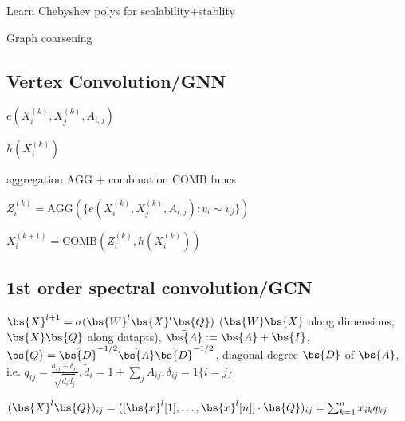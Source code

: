  \begin{inparaitem}[$\color{mygreen} \triangleright$]
\item Learn Chebyshev polys for scalability+stablity
\item Graph coarsening
\end{inparaitem}

\subsection*{Vertex Convolution/GNN}

\begin{inparaitem}[$\color{mygreen} \triangleright$]
\item {} $e(X^{(k)}_i,X^{(k)}_j,A_{i,j})$
\item {} $h(X^{(k)}_i)$
\item aggregation $\text{AGG}$ + combination $\text{COMB}$ funcs
\end{inparaitem}

$Z^{(k)}_i=\text{AGG}(\{e(X^{(k)}_i,X^{(k)}_j,A_{i,j}):v_i\sim v_j\})$

$X^{(k+1)}_i=\text{COMB}(Z^{(k)}_i,h(X^{(k)}_i))$

\subsection*{1st order spectral convolution/GCN}

$\bs{X}^{l+1}=\sigma( \bs{W}^{l}\bs{X}^{l}\bs{Q} )$ ($\bs{W}\bs{X}$ along dimensions, $\bs{X}\bs{Q}$ along datapts), $\tilde{\bs{A}}:=\bs{A}+\bs{I}$,
$\bs{Q}=\tilde{\bs{D}}^{-1/2}\tilde{\bs{A}}\tilde{\bs{D}}^{-1/2}$, diagonal degree $\tilde{\bs{D}}$ of $\tilde{\bs{A}}$, i.e. 
$q_{ij}=\frac{a_{ij}+\delta_{ij}}{\sqrt{\tilde{d}_{i}\tilde{d}_{j}}}, \tilde{d}_{i}=1+\sum_j A_{ij}, \delta_{ij}=1\{i=j\}$

$(\bs{X}^l\bs{Q})_{ij}=([\bs{x}^l[1],\dots,\bs{x}^l[n]]\cdot \bs{Q})_{ij}=\sum^n_{k=1}x_{ik}q_{kj}$

